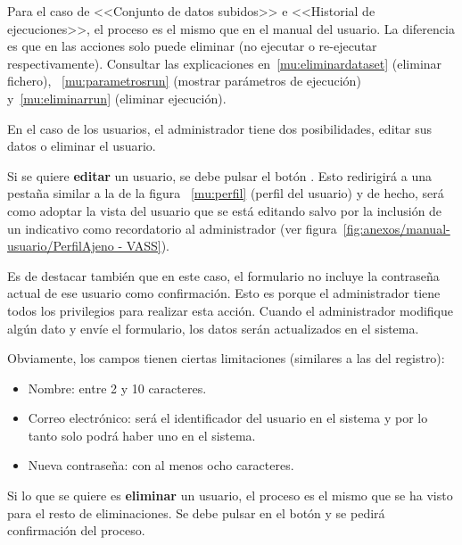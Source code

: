 Para el caso de <<Conjunto de datos subidos>> e <<Historial de ejecuciones>>, el
proceso es el mismo que en el manual del usuario. La diferencia es que en las
acciones solo puede eliminar (no ejecutar o re-ejecutar respectivamente).
Consultar las explicaciones  en~\ref{mu:eliminardataset} (eliminar fichero),
~\ref{mu:parametrosrun} (mostrar parámetros de ejecución) y~\ref{mu:eliminarrun}
(eliminar ejecución).

En el caso de los usuarios, el administrador tiene dos posibilidades, editar sus
datos o eliminar el usuario.

Si se quiere \textbf{editar} un usuario, se debe pulsar el botón
\button[vassgreen]{\faPencil}. Esto redirigirá a una pestaña similar a la de la
figura ~\ref{mu:perfil} (perfil del usuario) y de hecho, será como adoptar la
vista del usuario que se está editando salvo por la inclusión de un indicativo
como recordatorio al administrador (ver
figura~\ref{fig:anexos/manual-usuario/PerfilAjeno - VASS}).


Es de destacar también que en este caso, el formulario no incluye la contraseña
actual de ese usuario como confirmación. Esto es porque el administrador tiene
todos los privilegios para realizar esta acción. Cuando el administrador
modifique algún dato y envíe el formulario, los datos serán actualizados en el
sistema. 

Obviamente, los campos tienen ciertas limitaciones (similares a las del
registro):
\begin{itemize}
    \item Nombre: entre 2 y 10 caracteres.
    \item Correo electrónico: será el identificador del usuario en el sistema y
    por lo tanto solo podrá haber uno en el sistema.
    \item Nueva contraseña: con al menos ocho caracteres.
\end{itemize}

Si lo que se quiere es \textbf{eliminar} un usuario, el proceso es el mismo que
se ha visto para el resto de eliminaciones. Se debe pulsar en el botón
\button[vassred]{\faTrash} y se pedirá confirmación del proceso.